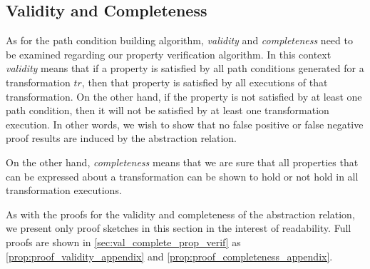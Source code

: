 
\subsection{Validity and Completeness}
\label{subsec:prop_proving_valid_complete}

As for the path condition building algorithm, \emph{validity} and
\emph{completeness} need to be examined regarding our property verification
algorithm. In this context \emph{validity} means that if a property is satisfied by all path conditions generated for a transformation $tr$, then that property is satisfied by all executions of that transformation. On the other hand, if the property is not satisfied by at least one path condition, then it will not be satisfied by at least one transformation execution. In other words, we wish to show that no false positive or false negative proof results are induced by the abstraction relation.


On the other hand, \emph{completeness} means that we are sure that all properties that can be expressed about a transformation can be shown to hold or not hold in all transformation executions.

As with the proofs for the validity and completeness of the abstraction relation, we present only proof sketches in this section in the interest of readability. Full proofs are shown in \cref{sec:val_complete_prop_verif} as \cref{prop:proof_validity_appendix} and \cref{prop:proof_completeness_appendix}.

% 

